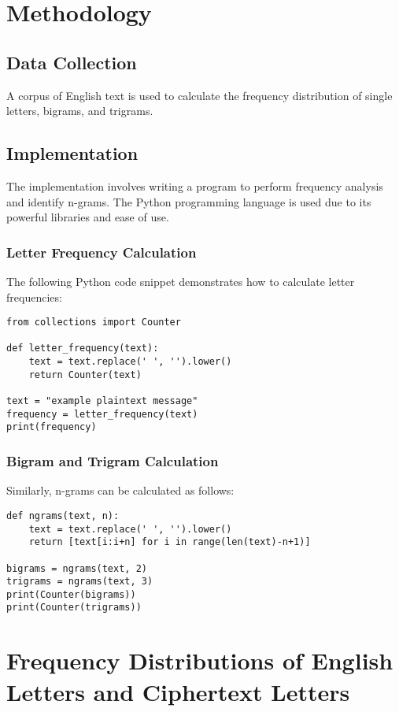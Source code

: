 \documentclass[12pt]{article}
\begin{document}
\section{Methodology}
\subsection{Data Collection}
A corpus of English text is used to calculate the frequency distribution of single letters, bigrams, and trigrams.

\subsection{Implementation}
The implementation involves writing a program to perform frequency analysis and identify n-grams. The Python programming language is used due to its powerful libraries and ease of use.

\subsubsection{Letter Frequency Calculation}
The following Python code snippet demonstrates how to calculate letter frequencies:
\begin{lstlisting}
from collections import Counter

def letter_frequency(text):
	text = text.replace(' ', '').lower()
	return Counter(text)

text = "example plaintext message"
frequency = letter_frequency(text)
print(frequency)
\end{lstlisting}

\subsubsection{Bigram and Trigram Calculation}
Similarly, n-grams can be calculated as follows:
\begin{lstlisting}
def ngrams(text, n):
	text = text.replace(' ', '').lower()
	return [text[i:i+n] for i in range(len(text)-n+1)]

bigrams = ngrams(text, 2)
trigrams = ngrams(text, 3)
print(Counter(bigrams))
print(Counter(trigrams))
\end{lstlisting}

\section{Frequency Distributions of English Letters and Ciphertext Letters}
\end{document}

